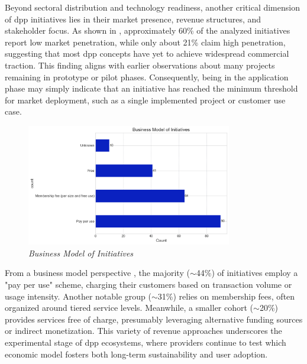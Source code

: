 Beyond sectoral distribution and technology readiness, another critical dimension of \ac{dpp} initiatives lies in their market presence, revenue structures, and stakeholder focus. As shown in , approximately 60\% of the analyzed initiatives report low market penetration, while only about 21\% claim high penetration, suggesting that most \ac{dpp} concepts have yet to achieve widespread commercial traction. This finding aligns with earlier observations about many projects remaining in prototype or pilot phases. Consequently, being in the application phase may simply indicate that an initiative has reached the minimum threshold for market deployment, such as a single implemented project or customer use case.

\begin{figure}[H]
  \centering
  \includegraphics[width=0.8\textwidth]{figures/initiatives_buesiness_model.png}
  \caption{%
    \textit{Business Model of Initiatives} 
  }
  \label{fig:initiatives_buesiness_model}
\end{figure}

From a business model perspective , the majority ($\sim$44\%) of initiatives employ a "pay per use" scheme, charging their customers based on transaction volume or usage intensity. Another notable group ($\sim$31\%) relies on membership fees, often organized around tiered service levels. Meanwhile, a smaller cohort ($\sim$20\%) provides services free of charge, presumably leveraging alternative funding sources or indirect monetization. This variety of revenue approaches underscores the experimental stage of \ac{dpp} ecosystems, where providers continue to test which economic model fosters both long-term sustainability and user adoption.

